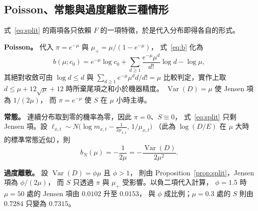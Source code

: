 \documentclass[UTF8, fontset=macnew, a4paper, 12pt]{ctexart}
\begin{document}
\subsection{Poisson、常態與過度離散三種情形}\label{sec:normal}

式~\eqref{eq:split} 的兩項各只依賴 $F$ 的一項特徵，於是代入分布即得各自的形式。

\textbf{Poisson。} 代入 $\pi=e^{-\mu}$ 與 $\mu_{+}=\mu/(1-e^{-\mu})$，
式~\eqref{eq:b} 化為
\begin{equation}\label{eq:bform}
b(\mu;c_0)=e^{-\mu}\log c_0
+\sum_{d\ge1}\frac{e^{-\mu}\mu^{d}}{d!}\log d-\log\mu ,
\end{equation}
其絕對收斂可由 $\log d\le d$ 與 $\sum_{d\ge1}e^{-\mu}\mu^{d}d/d!=\mu$
比較判定，實作上取 $d\le\mu+12\sqrt{\mu}+12$ 時所棄尾項之和小於機器精度。
$\operatorname{Var}(D)=\mu$ 使 Jensen 項為 $1/(2\mu)$，
而 $\pi=e^{-\mu}$ 使 $S$ 在 $\mu$ 小時主導。

\textbf{常態。} 連續分布取到零的機率為零，因此 $\pi=0$、$S\equiv0$，
式~\eqref{eq:split} 只剩 Jensen 項。設
$\ell_{x,t}\sim N\!\big(\log m_{x,t}-\tfrac{1}{2\mu_{x,t}},\,1/\mu_{x,t}\big)$
（此為 $\log(D/E)$ 在 $\mu$ 大時的標準常態近似），則
\begin{equation}\label{eq:bnormal}
b_N(\mu)=-\frac{1}{2\mu}=-\frac{\operatorname{Var}(D)}{2\mu^{2}} .
\end{equation}

\textbf{過度離散。} 設 $\operatorname{Var}(D)=\phi\mu$ 且 $\phi>1$，
則由 Proposition~\ref{prop:split}，Jensen 項為 $\phi/(2\mu)$，
而 $S$ 只透過 $\pi$ 與 $\mu_{+}$ 受影響。以負二項代入計算，
$\phi=1.5$ 時 $\mu=50$ 處的 Jensen 項由 $0.0102$ 升至 $0.0153$，
與 $\phi$ 成比例；$\mu=0.3$ 處的 $S$ 則由 $0.7284$ 只變為 $0.7315$。
\end{document}
